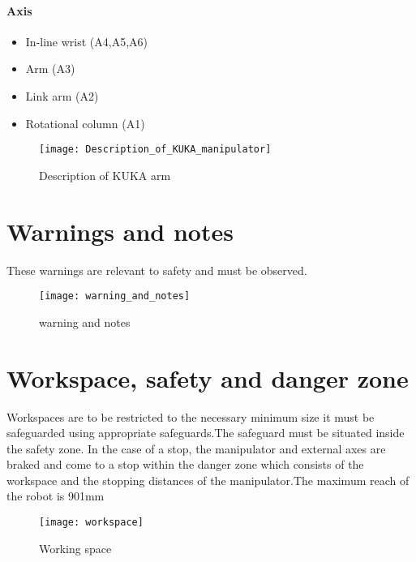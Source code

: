 \paragraph{Axis}
\begin{itemize}
	\item In-line wrist (A4,A5,A6)
	\item Arm (A3)
	\item Link arm (A2)
	\item Rotational column (A1)
\end{itemize}
 
\begin{figure}[h]
	\centering
	\texttt{[image: Description\_of\_KUKA\_manipulator]}
    	\caption{Description of KUKA arm}
\end{figure}

\section{Warnings and notes}
These warnings are relevant to safety and must be observed.
\begin{figure}[h]
	\centering
	\texttt{[image: warning\_and\_notes]}
    	\caption{warning and notes}
\end{figure}


\section{Workspace, safety and danger zone}
Workspaces are to be restricted to the necessary minimum size it must be safeguarded using appropriate safeguards.The safeguard must be situated inside the safety zone. In the case of a stop, the manipulator and external axes are braked and come to a stop within the danger zone which consists of the workspace and the stopping distances of the manipulator.The maximum reach of the robot is 901mm
\begin{figure}[h]
	\centering
	\texttt{[image: workspace]}
    	\caption{Working space}
\end{figure}

